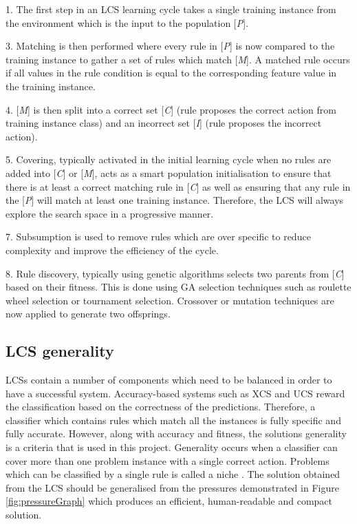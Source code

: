 1.	The first step in an LCS learning cycle takes a single training instance from the environment which is the input to the population [\textit{P}].  

3. 	Matching is then performed where every rule in [\textit{P}] is now compared to the training instance to gather a set of rules which match [\textit{M}]. A matched rule occurs if all values in the rule condition is equal to the corresponding feature value in the training instance. 

4.	[\textit{M}] is then split into a correct set [\textit{C}] (rule proposes the correct action from training instance class) and an incorrect set [\textit{I}] (rule proposes the incorrect action). 

5.  Covering, typically activated in the initial learning cycle when no rules are added into  [\textit{C}] or [\textit{M}], acts as a smart population initialisation to ensure that there is at least a correct matching rule in [\textit{C}] as well as ensuring that any rule in the [\textit{P}] will match at least one training instance. Therefore, the LCS will always explore the search space in a progressive manner.

7.	Subsumption is used to remove rules which are over specific to reduce complexity and improve the efficiency of the cycle. 

8.	Rule discovery, typically using genetic algorithms selects two parents from [\textit{C}] based on their fitness. This is done using GA selection techniques such as roulette wheel selection or tournament selection. Crossover or mutation techniques are now applied to generate two offsprings. 

\subsection{LCS generality}
LCSs contain a number of components which need to be balanced in order to have a successful system. Accuracy-based systems such as XCS and UCS reward the classification based on the correctness of the predictions. Therefore, a classifier which contains rules which match all the instances is fully specific and fully accurate. However, along with accuracy and fitness, the solution\textquotesingle s generality is a criteria that is used in this project. Generality occurs when a classifier can cover more than one problem instance with a single correct action. Problems which can be classified by a single rule is called a niche \cite{urbanowicz2017introduction}. The solution obtained from the LCS should be generalised from the pressures demonstrated in Figure \ref{fig:pressureGraph} which produces an efficient, human-readable and compact solution.

